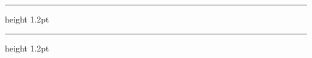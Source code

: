 \documentclass[11pt,a4paper]{ctexart}
\theoremstyle{definition}
\theoremstyle{remark}
\begin{document}
{\color{accent}\hrule height 1.2pt}
\vspace{1.2em}


\vspace{1.6em}
{\color{accent}\hrule height 1.2pt}
\end{document}
